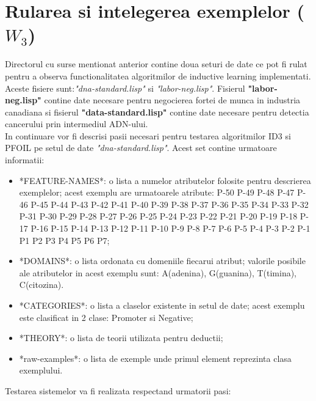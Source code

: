 \documentclass[a4paper,12pt]{report}
\begin{document}
\chapter{Rularea si intelegerea exemplelor ($W_3$)}
	Directorul cu surse mentionat anterior contine doua seturi de date ce pot fi rulat pentru a observa functionalitatea algoritmilor de inductive learning implementati. Aceste fisiere sunt:\textit{"dna-standard.lisp"} si \textit{"labor-neg.lisp"}. 
	Fisierul \textbf{"labor-neg.lisp"} contine date necesare pentru negocierea fortei de munca in industria canadiana si fisierul \textbf{"data-standard.lisp"} contine date necesare pentru detectia cancerului prin intermediul ADN-ului.\\
	In continuare vor fi descrisi pasii necesari pentru testarea algoritmilor ID3 si PFOIL pe setul de date \textit{"dna-standard.lisp"}. Acest set contine urmatoare informatii:
\begin{itemize}
\item *FEATURE-NAMES*: o lista a numelor atributelor folosite pentru descrierea exemplelor; acest exemplu are urmatoarele atribute: P-50 P-49 P-48 P-47 P-46 P-45 P-44 P-43 P-42 P-41 P-40 P-39 P-38 P-37 P-36 P-35 P-34 P-33 P-32 P-31 P-30 P-29 P-28 P-27 P-26 P-25 P-24 P-23 P-22 P-21 P-20 P-19 P-18 P-17 P-16 P-15 P-14 P-13 P-12 P-11 P-10 P-9 P-8 P-7 P-6 P-5 P-4 P-3 P-2 P-1 P1 P2 P3 P4 P5 P6 P7;
\item *DOMAINS*: o lista ordonata cu domeniile fiecarui atribut; valorile posibile ale atributelor in acest exemplu sunt: A(adenina), G(guanina), T(timina), C(citozina).
\item *CATEGORIES*: o lista a claselor existente in setul de date; acest exemplu este clasificat in 2 clase: Promoter si Negative;
\item *THEORY*: o lista de teorii utilizata pentru deductii;
\item *raw-examples*: o lista de exemple unde primul element reprezinta clasa exemplului.
\end{itemize}
	Testarea sistemelor va fi realizata respectand urmatorii pasi:
\end{document}

